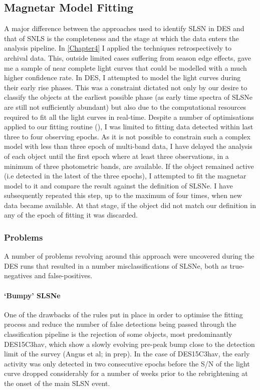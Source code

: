 \subsection{Magnetar Model Fitting}
A major difference between the approaches used to identify SLSN in DES and that of SNLS is the completeness and the stage at which the data enters the analysis pipeline. In \cref{Chapter4} I applied the techniques retrospectively to archival data. This, outside limited cases suffering from season edge effects, gave me a sample of near complete light curves that could be modelled with a much higher confidence rate. In DES, I attempted to model the light curves during their early rise phases. This was a constraint dictated not only by our desire to classify the objects at the earliest possible phase (as early time spectra of SLSNe are still not sufficiently abundant) but also due to the computational resources required to fit all the light curves in real-time. Despite a number of optimisations applied to our fitting routine (), I was limited to fitting data detected within last three to four observing epochs. As it is not possible to constrain such a complex model with less than three epoch of multi-band data, I have delayed the analysis of each object until the first epoch where at least three observations, in a minimum of three photometric bands, are available. If the object remained active (i.e detected in the latest of the three epochs), I attempted to fit the magnetar model to it and compare the result against the definition of SLSNe. I have subsequently repeated this step, up to the maximum of four times, when new data became available. At that stage, if the object did not match our definition in any of the epoch of fitting it was discarded.

\subsubsection{Problems}
A number of problems revolving around this approach were uncovered during the DES runs that resulted in a number misclassifications of SLSNe, both as true-negatives and false-positives.

\paragraph{`Bumpy' SLSNe}
One of the drawbacks of the rules put in place in order to optimise the fitting process and reduce the number of false detections being passed through the classification pipeline is the rejection of some objects, most predominantly DES15C3hav, which show a slowly evolving pre-peak bump close to the detection limit of the survey (Angus et al; in prep). In the case of DES15C3hav, the early activity was only detected in two consecutive epochs before the S/N of the light curve dropped considerably for a number of weeks prior to the rebrightening at the onset of the main SLSN event.

